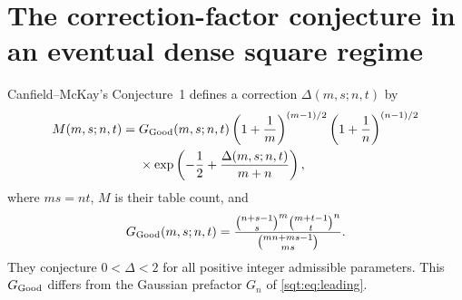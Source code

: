 \section{The correction-factor conjecture in an eventual dense square regime}\label{sqt:sec:conjecture}
Canfield--McKay's Conjecture~1 \cite[Eq.~(1.4)]{CM} defines a correction $\Delta(m,s;n,t)$ by
\begin{align}\label{sqt:eq:CMdelta}
M(m,s;n,t)={}&G_{\rm Good}(m,s;n,t)
 \left(1+\frac1m\right)^{(m-1)/2}
 \left(1+\frac1n\right)^{(n-1)/2}\notag\\
&\times\exp\left(-\frac12+\frac{\Delta(m,s;n,t)}{m+n}\right),
\end{align}
where $ms=nt$, $M$ is their table count, and
\[
G_{\rm Good}(m,s;n,t)=
\frac{\binom{n+s-1}{s}^{m}\binom{m+t-1}{t}^{n}}
 {\binom{mn+ms-1}{ms}}.
\]
They conjecture $0<\Delta<2$ for all positive integer admissible parameters. This $G_{\rm Good}$ differs from the Gaussian prefactor $G_n$ of \eqref{sqt:eq:leading}.

